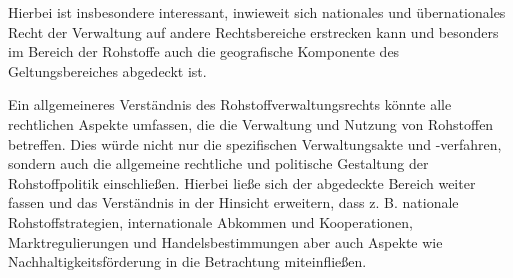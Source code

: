 \documentclass[12pt,a4paper,oneside]{book} %
\begin{document}
Hierbei ist insbesondere interessant, inwieweit sich nationales und übernationales Recht der Verwaltung auf andere Rechtsbereiche erstrecken kann und besonders im Bereich der Rohstoffe auch die geografische Komponente des Geltungsbereiches abgedeckt ist.

Ein allgemeineres Verständnis des Rohstoffverwaltungsrechts könnte alle rechtlichen Aspekte umfassen, die die Verwaltung und Nutzung von Rohstoffen betreffen. Dies würde nicht nur die spezifischen Verwaltungsakte und -verfahren, sondern auch die allgemeine rechtliche und politische Gestaltung der Rohstoffpolitik einschließen. Hierbei ließe sich der abgedeckte Bereich weiter fassen und das Verständnis in der Hinsicht erweitern, dass z. B. nationale Rohstoffstrategien, internationale Abkommen und Kooperationen, Marktregulierungen und Handelsbestimmungen aber auch Aspekte wie Nachhaltigkeitsförderung in die Betrachtung miteinfließen.
\end{document}

